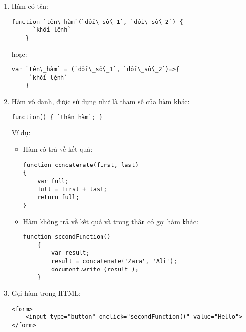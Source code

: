 \begin{enumerate}
\item	Hàm có tên:
\lstset{language=XML}
\begin{lstlisting}[escapechar=`]
	function `tên\_hàm`(`đối\_số\_1`, `đối\_số\_2`) {
  	  `khối lệnh`
	}
\end{lstlisting}

hoặc:
\lstset{language=XML}
\begin{lstlisting}[escapechar=`]
	var `tên\_hàm` = (`đối\_số\_1`, `đối\_số\_2`)=>{
   	 `khối lệnh`
	}
\end{lstlisting}
\item	Hàm vô danh, được sử dụng như là tham số của hàm khác:
\lstset{language=XML}
\begin{lstlisting}[escapechar=`]
	function() { `thân hàm`; }
\end{lstlisting}

Ví dụ:
\begin{itemize}


\item	Hàm có trả về kết quả:
\lstset{language=XML}
\begin{lstlisting}[escapechar=`]
function concatenate(first, last)
{
	var full;
	full = first + last;
	return full;
}
\end{lstlisting}
\item	Hàm không trả về kết quả và trong thân có gọi hàm khác:
\lstset{language=XML}
\begin{lstlisting}[escapechar=`] 
	function secondFunction()
	{
		var result;
		result = concatenate('Zara', 'Ali');
		document.write (result );
	}
\end{lstlisting}
\end{itemize}
\item	Gọi hàm trong HTML:
\lstset{language=XML}
\begin{lstlisting}[escapechar=`]
<form>
	<input type="button" onclick="secondFunction()" value="Hello">
</form>
\end{lstlisting}

\end{enumerate}
